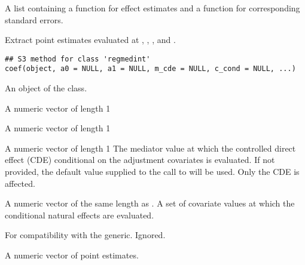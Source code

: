\documentclass[a4paper]{book}
\begin{document}
%
\begin{Value}
A list containing a function for effect estimates and a function for corresponding standard errors.
\end{Value}
%
\begin{Description}
Extract point estimates evaluated at , , , and .
\end{Description}
%
\begin{Usage}
\begin{verbatim}
## S3 method for class 'regmedint'
coef(object, a0 = NULL, a1 = NULL, m_cde = NULL, c_cond = NULL, ...)
\end{verbatim}
\end{Usage}
%
\begin{Arguments}
\begin{ldescription}
\item[\code{object}] An object of the  class.

\item[\code{a0}] A numeric vector of length 1

\item[\code{a1}] A numeric vector of length 1

\item[\code{m\_cde}] A numeric vector of length 1 The mediator value at which the controlled direct effect (CDE) conditional on the adjustment covariates is evaluated. If not provided, the default value supplied to the call to  will be used. Only the CDE is affected.

\item[\code{c\_cond}] A numeric vector of the same length as . A set of covariate values at which the conditional natural effects are evaluated.

\item[\code{...}] For compatibility with the generic. Ignored.
\end{ldescription}
\end{Arguments}
%
\begin{Value}
A numeric vector of point estimates.
\end{Value}
%
\end{document}
